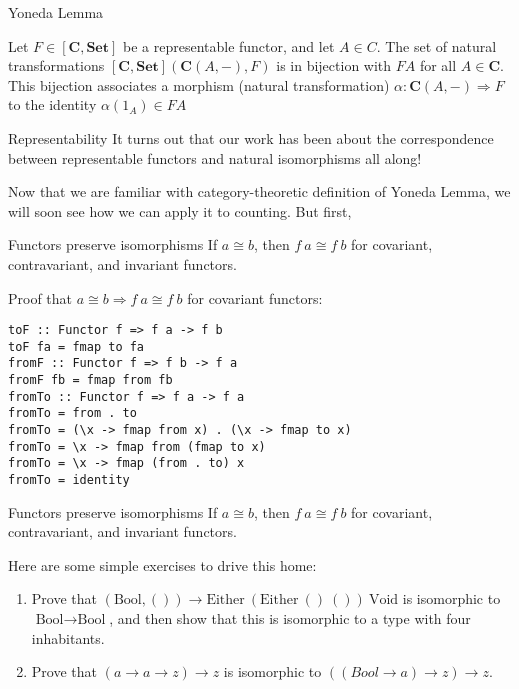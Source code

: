 \documentclass[tikz]{beamer}
\theoremstyle{definition}
\begin{document}
\begin{frame}{Yoneda Lemma}
    
    \begin{definition}
        Let $F \in [\mathbf{C}, \mathbf{Set}]$ be a representable functor, and let $A \in C$. The set of natural transformations $[\mathbf{C}, \mathbf{Set}](\mathbf{C}(A,-), F)$ is in bijection with $FA$ for all $A \in \mathbf{C}$. This bijection associates a morphism (natural transformation) $\alpha: \mathbf{C}(A,-) \Rightarrow F$ to the identity $\alpha(1_A) \in FA$
    \end{definition}{}
\end{frame}

\begin{frame}{Representability}
    It turns out that our work has been about the correspondence between representable functors and natural isomorphisms all along!
\end{frame}{}

\begin{frame}
Now that we are familiar with category-theoretic definition of Yoneda Lemma, we will soon see how we can apply it to counting. But first,
\begin{block}{Functors preserve isomorphisms}
If $a \cong b$, then $f~a \cong f~b$ for covariant, contravariant, and invariant functors.
\end{block}
\end{frame}

\begin{frame}[fragile]
Proof that $a \cong b \Rightarrow f~a \cong f~b$ for covariant functors:
\begin{verbatim}
toF :: Functor f => f a -> f b
toF fa = fmap to fa
fromF :: Functor f => f b -> f a
fromF fb = fmap from fb
fromTo :: Functor f => f a -> f a
fromTo = from . to
fromTo = (\x -> fmap from x) . (\x -> fmap to x)
fromTo = \x -> fmap from (fmap to x)
fromTo = \x -> fmap (from . to) x
fromTo = identity
\end{verbatim}
\end{frame}

\begin{frame}{}
\begin{block}{Functors preserve isomorphisms}
If $a \cong b$, then $f~a \cong f~b$ for covariant, contravariant, and invariant functors.
\end{block}

Here are some simple exercises to drive this home:
\begin{enumerate}
    \item Prove that $(\text{Bool}, ()) \to \text{Either}~(\text{Either}~()~())~\text{Void}$ is isomorphic to $\text{Bool} \to \text{Bool}$, and then show that this is isomorphic to a type with four inhabitants.
    \item Prove that $(a \to a \to z) \to z$ is isomorphic to $((Bool \to a) \to z) \to z$.
\end{enumerate}
\end{frame}
\end{document}
